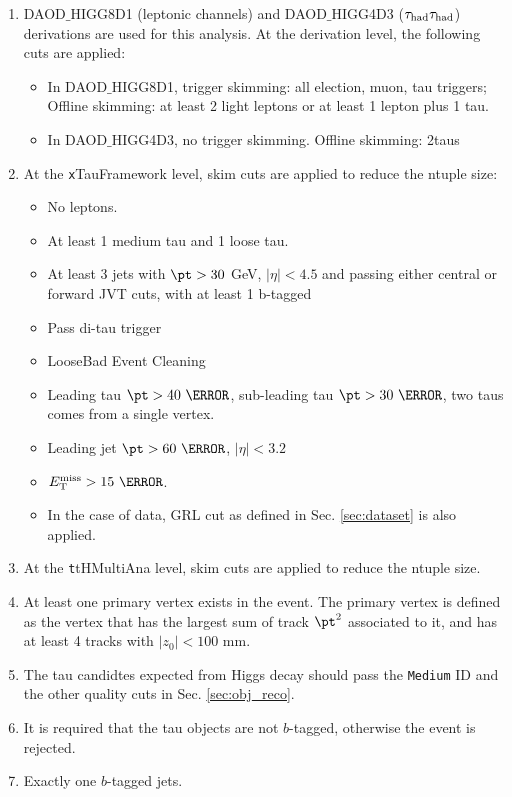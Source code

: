 \begin{enumerate}
\item DAOD$\_$HIGG8D1 (leptonic channels) and DAOD$\_$HIGG4D3 ($\tau_\text{had}{}\tau_\text{had}$) derivations are used for this analysis. At the derivation level, the following cuts are applied:
  \begin{itemize}


  \item In DAOD$\_$HIGG8D1, trigger skimming: all election, muon, tau triggers; Offline skimming: at least 2 light leptons or at least 1 lepton plus 1 tau.
  \item In DAOD$\_$HIGG4D3, no trigger skimming. Offline skimming: 2taus
  \end{itemize}

\item At the {\texttt xTauFramework} level, skim cuts are applied to reduce the ntuple size:
  \begin{itemize}
  \item No leptons.
  \item At least 1 medium tau and 1 loose tau.
  \item At least 3 jets with $\pt>30$ GeV, $|\eta|<4.5$ and passing either central or forward JVT cuts, with at least 1 b-tagged
  \item Pass di-tau trigger
  \item LooseBad Event Cleaning
  \item Leading tau $\pt>40~\GeV$, sub-leading tau $\pt>30~\GeV$, two taus comes from a single vertex.
  \item Leading jet $\pt>60~\GeV$, $|\eta|<3.2$
  \item $\met>15~\GeV$.
  \item In the case of data, GRL cut as defined in Sec. \ref{sec:dataset} is also applied.
  \end{itemize}

\item At the {\texttt ttHMultiAna} level, skim cuts \cite{ATL-COM-PHYS-2018-410} are applied to reduce the ntuple size.

\item At least one primary vertex exists in the event. The primary vertex is defined as the vertex that has the largest sum of track $\pt^2$ associated to it, and has at least 4 tracks with $|z_0|<100$ mm.
\item The tau candidtes expected from Higgs decay should pass the \texttt{Medium} ID and the other quality cuts in Sec. \ref{sec:obj_reco}.
\item It is required that the tau objects are not $b$-tagged, otherwise the event is rejected.
\item Exactly one $b$-tagged jets. 
\end{enumerate}

